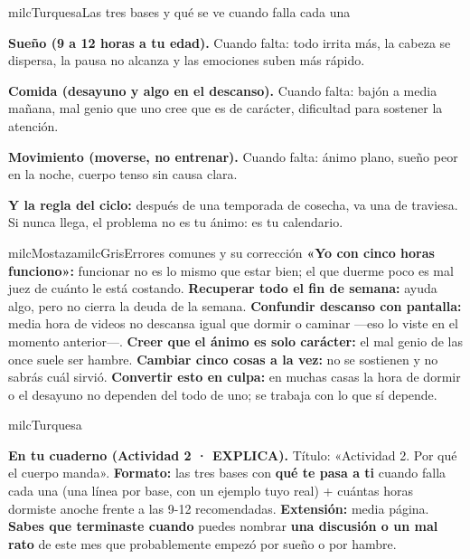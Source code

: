 \documentclass[11pt,letterpaper]{article}
\begin{document}
\begin{drawbox}{milcTurquesa}{Las tres bases y qué se ve cuando falla cada una}
\begin{pasoslista}
\item \textbf{Sueño (9 a 12 horas a tu edad).} Cuando falta: todo irrita más, la cabeza se dispersa, la pausa no alcanza y las emociones suben más rápido.
\item \textbf{Comida (desayuno y algo en el descanso).} Cuando falta: bajón a media mañana, mal genio que uno cree que es de carácter, dificultad para sostener la atención.
\item \textbf{Movimiento (moverse, no entrenar).} Cuando falta: ánimo plano, sueño peor en la noche, cuerpo tenso sin causa clara.
\item \textbf{Y la regla del ciclo:} después de una temporada de cosecha, va una de traviesa. Si nunca llega, el problema no es tu ánimo: es tu calendario.
\end{pasoslista}
\end{drawbox}

\begin{softbox}{milcMostaza}{milcGris}{Errores comunes y su corrección}
\textbf{«Yo con cinco horas funciono»:} funcionar no es lo mismo que estar bien; el que duerme poco es mal juez de cuánto le está costando. \textbf{Recuperar todo el fin de semana:} ayuda algo, pero no cierra la deuda de la semana. \textbf{Confundir descanso con pantalla:} media hora de videos no descansa igual que dormir o caminar ---eso lo viste en el momento anterior---. \textbf{Creer que el ánimo es solo carácter:} el mal genio de las once suele ser hambre. \textbf{Cambiar cinco cosas a la vez:} no se sostienen y no sabrás cuál sirvió. \textbf{Convertir esto en culpa:} en muchas casas la hora de dormir o el desayuno no dependen del todo de uno; se trabaja con lo que sí depende.
\end{softbox}

\begin{infoband}{milcTurquesa}


\textbf{En tu cuaderno (Actividad 2 · EXPLICA).} Título: «Actividad 2. Por qué el cuerpo manda». \textbf{Formato:} las tres bases con \textbf{qué te pasa a ti} cuando falla cada una (una línea por base, con un ejemplo tuyo real) + cuántas horas dormiste anoche frente a las 9-12 recomendadas. \textbf{Extensión:} media página. \textbf{Sabes que terminaste cuando} puedes nombrar \textbf{una discusión o un mal rato} de este mes que probablemente empezó por sueño o por hambre.
\end{infoband}
\end{document}
